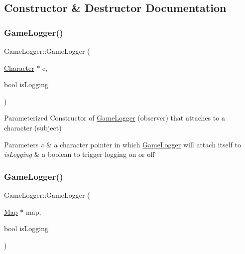 \subsection{Constructor \& Destructor Documentation}
\hypertarget{class_game_logger_a68b94bcdd67467fd79baf38031685d5a}{}\label{class_game_logger_a68b94bcdd67467fd79baf38031685d5a} 
\subsubsection{\texorpdfstring{Game\+Logger()}{GameLogger()}\hspace{0.1cm}{\footnotesize\ttfamily [1/7]}}
{\footnotesize\ttfamily Game\+Logger\+::\+Game\+Logger (\begin{DoxyParamCaption}\item[{\hyperlink{class_character}{Character} $\ast$}]{c,  }\item[{bool}]{is\+Logging }\end{DoxyParamCaption})}

Parameterized Constructor of \hyperlink{class_game_logger}{Game\+Logger} (observer) that attaches to a character (subject) 
\begin{DoxyParams}{Parameters}
{\em c} & a character pointer in which \hyperlink{class_game_logger}{Game\+Logger} will attach itself to \\
\hline
{\em is\+Logging} & a boolean to trigger logging on or off \\
\hline
\end{DoxyParams}
\hypertarget{class_game_logger_a2ef865c082fa50a3b6abafcc7fa8dae0}{}\label{class_game_logger_a2ef865c082fa50a3b6abafcc7fa8dae0} 
\subsubsection{\texorpdfstring{Game\+Logger()}{GameLogger()}\hspace{0.1cm}{\footnotesize\ttfamily [2/7]}}
{\footnotesize\ttfamily Game\+Logger\+::\+Game\+Logger (\begin{DoxyParamCaption}\item[{\hyperlink{class_map}{Map} $\ast$}]{map,  }\item[{bool}]{is\+Logging }\end{DoxyParamCaption})}

